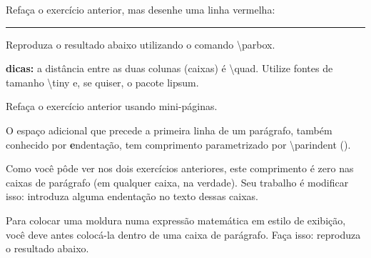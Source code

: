 \documentclass[a4paper,10pt,twocolumn,landscape]{article}
\newcommand{\cs}[1]{{\normalfont\ttfamily\textbackslash\color{blue}#1}}
\newcommand{\pkg}[1]{{\normalfont\sffamily\color{orange}#1}}
\begin{document}
	\begin{exercicio}
		Refaça o exercício anterior, mas desenhe uma linha vermelha:
		
		\medskip
		
		{\color{red}\noindent\rule{\columnwidth}{1pt}}
		
	\end{exercicio}
	\begin{exercicio}
		Reproduza o resultado abaixo utilizando o comando \cs{parbox}.
		
		\medskip
		
		\begin{center}
			\tiny
			\parbox[t]{0.4\textwidth}{\lipsum[1]}\qquad%
			\parbox[t]{0.4\textwidth}{\lipsum[3]}
		\end{center}
		
		\smallskip
		
		\footnotesize
		\noindent\textbf{dicas:} a distância entre as duas colunas (caixas) é
		\cs{quad}. Utilize fontes de tamanho \cs{tiny} e, se quiser, o pacote
		\pkg{lipsum}.
	\end{exercicio}
	\begin{exercicio}
		Refaça o exercício anterior usando mini-páginas.
	\end{exercicio}
	\begin{exercicio}
		O espaço adicional que precede a primeira linha de um parágrafo, também
		conhecido por \textbf{e}ndentação, tem comprimento parametrizado por
		\cs{parindent} (\foreign{paragraph indentation}).
		
		Como você pôde ver nos dois exercícios anteriores, este comprimento é zero
		nas caixas de parágrafo (em qualquer caixa, na verdade). Seu trabalho 
		é modificar isso: introduza alguma endentação no texto dessas caixas.
	\end{exercicio}
	\begin{exercicio}
	Para colocar uma moldura numa expressão matemática em estilo de exibição, 
	você deve antes colocá-la dentro de uma caixa de parágrafo. Faça isso:
	reproduza o resultado abaixo.
			
	\medskip
	
	\noindent\framebox[\columnwidth]{%
		\parbox{\columnwidth}{%
			\[
				\int\limits_0^{2\pi} \sin(nx)\sin(mx)\, dx = \delta_{nm}
			\]}}
	\end{exercicio}
	
\end{document}
